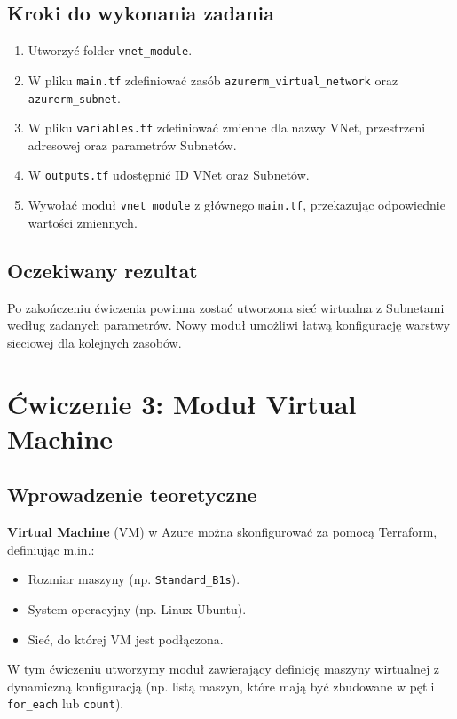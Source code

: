 \documentclass{article}
\begin{document}
\subsection{Kroki do wykonania zadania}
\begin{enumerate}
    \item Utworzyć folder \texttt{vnet\_module}.
    \item W pliku \texttt{main.tf} zdefiniować zasób \texttt{azurerm\_virtual\_network} oraz \texttt{azurerm\_subnet}.
    \item W pliku \texttt{variables.tf} zdefiniować zmienne dla nazwy VNet, przestrzeni adresowej oraz parametrów Subnetów.
    \item W \texttt{outputs.tf} udostępnić ID VNet oraz Subnetów.
    \item Wywołać moduł \texttt{vnet\_module} z głównego \texttt{main.tf}, przekazując odpowiednie wartości zmiennych.
\end{enumerate}

\subsection{Oczekiwany rezultat}
Po zakończeniu ćwiczenia powinna zostać utworzona sieć wirtualna z Subnetami według zadanych parametrów. Nowy moduł umożliwi łatwą konfigurację warstwy sieciowej dla kolejnych zasobów.

\section{Ćwiczenie 3: Moduł Virtual Machine}

\subsection{Wprowadzenie teoretyczne}
\textbf{Virtual Machine} (VM) w Azure można skonfigurować za pomocą Terraform, definiując m.in.:
\begin{itemize}
    \item Rozmiar maszyny (np. \texttt{Standard\_B1s}).
    \item System operacyjny (np. Linux Ubuntu).
    \item Sieć, do której VM jest podłączona.
\end{itemize}
W tym ćwiczeniu utworzymy moduł zawierający definicję maszyny wirtualnej z dynamiczną konfiguracją (np. listą maszyn, które mają być zbudowane w pętli \texttt{for\_each} lub \texttt{count}).
\end{document}
